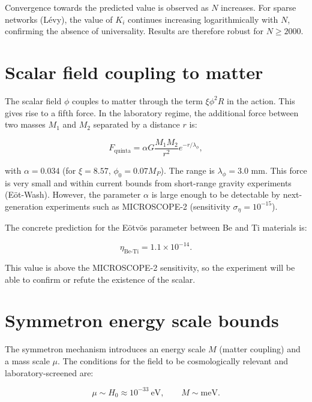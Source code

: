 \documentclass[12pt, a4paper]{article}
\theoremstyle{miuThm}
\theoremstyle{remark}
\begin{document}
Convergence towards the predicted value is observed as $N$ increases. For sparse networks (Lévy), the value of $K_i$ continues increasing logarithmically with $N$, confirming the absence of universality. Results are therefore robust for $N \ge 2000$.

\clearpage
\section{Scalar field coupling to matter}

The scalar field $\phi$ couples to matter through the term $\xi \phi^2 R$ in the action. This gives rise to a fifth force. In the laboratory regime, the additional force between two masses $M_1$ and $M_2$ separated by a distance $r$ is:

\begin{equation}
F_{\text{quinta}} = \alpha G \frac{M_1 M_2}{r^2} e^{-r/\lambda_\phi},
\end{equation}

with $\alpha = 0.034$ (for $\xi=8.57$, $\phi_0=0.07 M_P$). The range is $\lambda_\phi = 3.0$ mm. This force is very small and within current bounds from short-range gravity experiments (Eöt-Wash). However, the parameter $\alpha$ is large enough to be detectable by next-generation experiments such as MICROSCOPE-2 (sensitivity $\sigma_\eta = 10^{-15}$). 

The concrete prediction for the Eötvös parameter between Be and Ti materials is:

\begin{equation}
\eta_{\text{Be-Ti}} = 1.1\times10^{-14}.
\end{equation}

This value is above the MICROSCOPE-2 sensitivity, so the experiment will be able to confirm or refute the existence of the scalar.

\clearpage
\section{Symmetron energy scale bounds}

The symmetron mechanism introduces an energy scale $M$ (matter coupling) and a mass scale $\mu$. The conditions for the field to be cosmologically relevant and laboratory-screened are:

\begin{equation}
\mu \sim H_0 \approx 10^{-33}\ \text{eV}, \qquad M \sim \text{meV}.
\end{equation}
\end{document}
